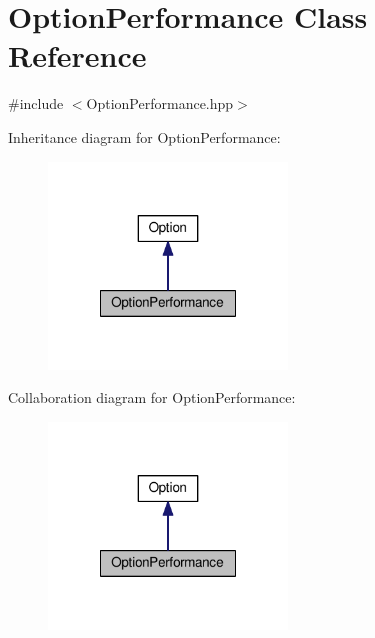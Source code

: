 \hypertarget{classOptionPerformance}{\section{Option\-Performance Class Reference}
\label{classOptionPerformance}
}


{\ttfamily \#include $<$Option\-Performance.\-hpp$>$}



Inheritance diagram for Option\-Performance\-:
\nopagebreak
\begin{figure}[H]
\begin{center}
\leavevmode
\includegraphics[width=180pt]{classOptionPerformance__inherit__graph}
\end{center}
\end{figure}


Collaboration diagram for Option\-Performance\-:
\nopagebreak
\begin{figure}[H]
\begin{center}
\leavevmode
\includegraphics[width=180pt]{classOptionPerformance__coll__graph}
\end{center}
\end{figure}
